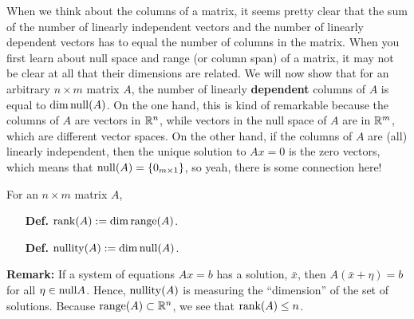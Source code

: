 When we think about the columns of a matrix, it seems pretty clear that the sum of the number of linearly independent vectors and the number of linearly dependent vectors has to equal the number of columns in the matrix. When you first learn about null space and range (or column span) of a matrix, it may not be clear at all that their dimensions are related. We will now show that for an arbitrary $n \times m$ matrix $A$, the number of linearly \textbf{dependent} columns of $A$ is equal to $\dim \mathrm{null} (A)$. On the one hand, this is kind of remarkable because the columns of $A$ are vectors in $\mathbb R^n$, while vectors in the null space of $A$ are in $\mathbb R^m$, which are different vector spaces. On the other hand, if the columns of $A$ are (all) linearly independent, then the unique solution to $Ax=0$ is the zero vectors, which means that $\mathrm{null}(A) = \{ 0_{m \times 1} \}$, so yeah, there is some connection here!

    \begin{tcolorbox}[title=\textbf{Definition of Rank and Nullity}]

For an $n \times m$ matrix $A$, 
\begin{enumerate}
    \item[{\bf Def.}] $\mathrm{rank}(A):=\dim \mathrm{range}(A)$.
    
    \item[{\bf Def.}] $\mathrm{nullity}(A):=\dim \mathrm{null} (A)$.
    
       \end{enumerate}
 \textbf{Remark:} If a system of equations $Ax=b$ has a solution, $\bar{x}$, then $A(\bar{x}+\eta) = b$ for all $\eta \in \mathrm{null}{A}$. Hence, $\mathrm{nullity}(A)$ is measuring the ``dimension'' of the set of solutions. Because $\mathrm{range}(A) \subset \mathbb R^n$, we see that $\mathrm{rank}(A) \le n$. 

\end{tcolorbox}
    
   
 
 

    \vspace*{.2cm}
    
